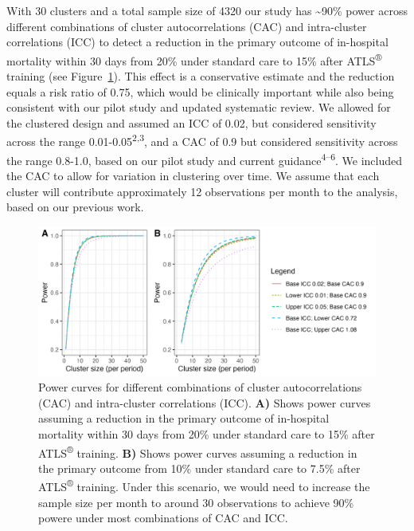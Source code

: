 \documentclass[
]{scrartcl}
\begin{document}
With 30 clusters and a total sample size of 4320 our study has
\textasciitilde90\% power across different combinations of cluster
autocorrelations (CAC) and intra-cluster correlations (ICC) to detect a
reduction in the primary outcome of in-hospital mortality within 30 days
from 20\% under standard care to 15\% after ATLS\textsuperscript{®}
training (see Figure~\ref{fig-power-curves}). This effect is a
conservative estimate and the reduction equals a risk ratio of 0.75,
which would be clinically important while also being consistent with our
pilot study and updated systematic review. We allowed for the clustered
design and assumed an ICC of 0.02, but considered sensitivity across the
range 0.01-0.05\textsuperscript{2,3}, and a CAC of 0.9 but considered
sensitivity across the range 0.8-1.0, based on our pilot study and
current guidance\textsuperscript{4--6}. We included the CAC to allow for
variation in clustering over time. We assume that each cluster will
contribute approximately 12 observations per month to the analysis,
based on our previous work.

\begin{figure}

{\centering \includegraphics{./combined-power-curves.png}

}

\caption{\label{fig-power-curves}Power curves for different combinations
of cluster autocorrelations (CAC) and intra-cluster correlations (ICC).
\textbf{A)} Shows power curves assuming a reduction in the primary
outcome of in-hospital mortality within 30 days from 20\% under standard
care to 15\% after ATLS\textsuperscript{®} training. \textbf{B)} Shows
power curves assuming a reduction in the primary outcome from 10\% under
standard care to 7.5\% after ATLS\textsuperscript{®} training. Under
this scenario, we would need to increase the sample size per month to
around 30 observations to achieve 90\% powere under most combinations of
CAC and ICC.}

\end{figure}
\end{document}
